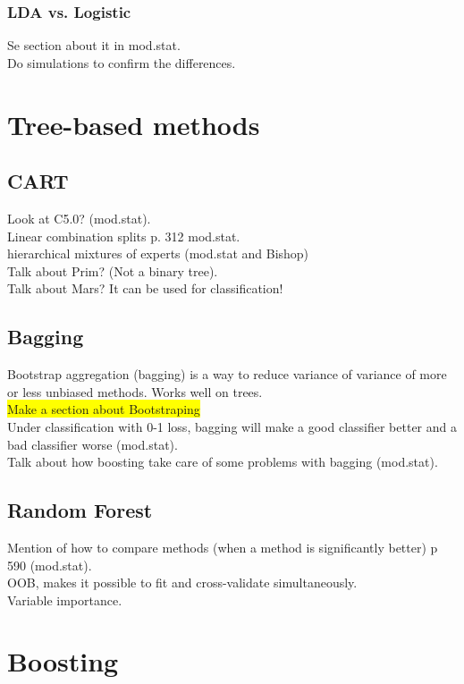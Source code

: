 \documentclass[11pt,a4paper]{article}
\begin{document}
\subsubsection{LDA vs. Logistic}
\label{sub:LDA vs. Logistic}
Se section about it in mod.stat. \\
Do simulations to confirm the differences. 

\section{Tree-based methods}
\label{sec:Tree-based methods}


\subsection{CART}
\label{sub:CART}
Look at C5.0? (mod.stat). \\
Linear combination splits p. 312 mod.stat. \\
hierarchical mixtures of experts (mod.stat and Bishop) \\ 
Talk about Prim? (Not a binary tree).\\ 
Talk about Mars? It can be used for classification! \\

\subsection{Bagging}
\label{sub:Bagging}
Bootstrap aggregation (bagging) is a way to reduce variance of variance of more or less unbiased methods. Works well on trees. \\
\colorbox{yellow}{Make a section about Bootstraping} \\
Under classification with 0-1 loss, bagging will make a good classifier better and a bad classifier worse (mod.stat). \\
Talk about how boosting take care of some problems with bagging (mod.stat).

\subsection{Random Forest}
\label{sec:Random Forest}
Mention of how to compare methods (when a method is significantly better) p 590 (mod.stat). \\
OOB, makes it possible to fit and cross-validate simultaneously. \\
Variable importance.

\section{Boosting}
\label{sec:Boosting}
\end{document}

